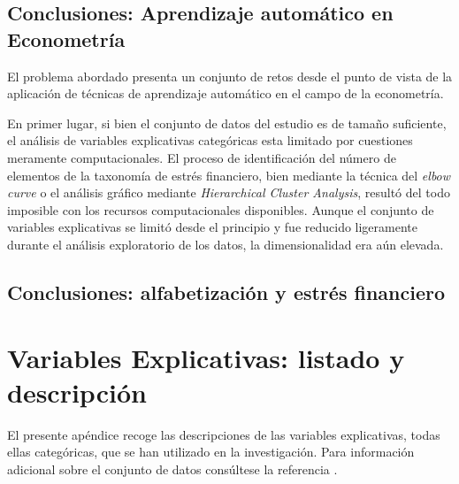 \documentclass[a4paper, 11pt]{article}
\begin{document}
\subsection{Conclusiones: Aprendizaje automático en Econometría}
\label{sec:sub:conclusions_ml}
El problema abordado presenta un conjunto de retos desde el punto de vista de la aplicación
de técnicas de aprendizaje automático en el campo de la econometría. 

En primer lugar, si bien el conjunto de datos del estudio es de tamaño suficiente, el 
análisis de variables explicativas categóricas esta limitado por cuestiones meramente 
computacionales. El proceso de identificación del número de elementos de la taxonomía 
de estrés financiero, bien mediante la técnica del \textit{elbow curve} o el análisis
gráfico mediante \textit{Hierarchical Cluster Analysis}, resultó del todo imposible
con los recursos computacionales disponibles. Aunque el conjunto de variables explicativas
se limitó desde el principio y fue reducido ligeramente durante el análisis exploratorio
de los datos, la dimensionalidad era aún elevada. 

\subsection{Conclusiones: alfabetización y estrés financiero}
\label{sec:sub:conclusions_financial_stress}

\section{Variables Explicativas: listado y descripción}
\label{sec:features_description}
El presente apéndice recoge las descripciones de las variables explicativas, todas ellas categóricas, 
que se han utilizado en la investigación. Para información adicional sobre el conjunto de datos 
consúltese la referencia \cite{NFCS01}.
\end{document}
